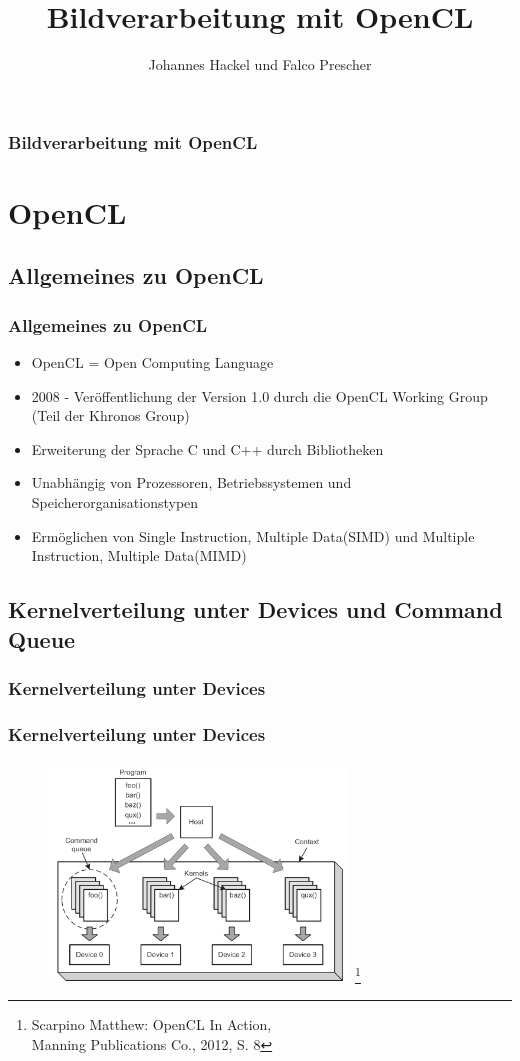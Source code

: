 \documentclass{beamer}
\author{Johannes Hackel und Falco Prescher}
\title{Bildverarbeitung mit OpenCL}
\begin{document}
\begin{frame}
\titlepage
\end{frame}

\begin{frame}
\frametitle{Bildverarbeitung mit OpenCL}
\tableofcontents
\end{frame}

\section{OpenCL}

\subsection{Allgemeines zu OpenCL}
\begin{frame}
\frametitle{Allgemeines zu OpenCL}
\begin{itemize}
\item OpenCL = Open Computing Language
\item 2008 - Veröffentlichung der Version 1.0 durch die OpenCL Working Group (Teil der Khronos Group)
\item Erweiterung der Sprache C und C++ durch Bibliotheken
\item Unabhängig von Prozessoren, Betriebssystemen und Speicherorganisationstypen
\item Ermöglichen von Single Instruction, Multiple Data(SIMD) und Multiple Instruction, Multiple Data(MIMD)
\end{itemize}
\end{frame}

\subsection{Kernelverteilung unter Devices und Command Queue}

\subsubsection*{Kernelverteilung unter Devices}
\begin{frame}
\frametitle{Kernelverteilung unter Devices}
\begin{figure}
\begin{center}
\includegraphics[width=8cm]{kernel_distr_manning_p8.PNG}
\footnote{\tiny{Scarpino Matthew: OpenCL In Action, \\Manning Publications Co., 2012, S. 8}}
\end{center}
\end{figure}
\end{frame}
\end{document}
